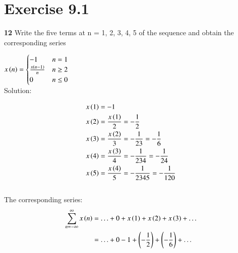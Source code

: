 \documentclass[journal,12pt,twocolumn]{IEEEtran}
\begin{document}


\vspace{3cm}

\title{}
\author{EE23BTECH11217 - Prajwal M$^{*}$
}
\maketitle
\newpage
\bigskip

\renewcommand{\thefigure}{\theenumi}
\renewcommand{\thetable}{\theenumi}


\section*{Exercise 9.1}

\noindent \textbf{12} \hspace{2pt}Write the five terms at n = 1, 2, 3, 4, 5 of the sequence and obtain the corresponding series

$ x \left(n\right) =
\begin{cases}
-1 & n = 1 \\
\frac{x \left(n-1\right)}{n} & n \geq 2 \\
 0 & n \leq 0
\end{cases}
$
\\

\noindent Solution:

\noindent
\begin{align}
x \left(1\right) & = -1 \\
x \left(2\right) & = \frac{x \left(1\right)}{2} = -\frac{1}{2} \\
x \left(3\right) & = \frac{x \left(2\right)}{3} = -\frac{1}{2   3} = -\frac{1}{6}\\
x \left(4\right) & = \frac{x \left(3\right)}{4} = -\frac{1}{2   3   4} = -\frac{1}{24}\\
x \left(5\right) & = \frac{x \left(4\right)}{5} = -\frac{1}{2   3   4   5} = -\frac{1}{120}
\end{align} \\


The corresponding series:
\begin{align}
    \sum_{n=-\infty}^{\infty} x \left(n\right) & = \ldots + 0 + x \left(1\right) + x \left(2\right) + x \left(3\right) + \ldots \\
    & = \ldots + 0 -1 +   \left(-\frac{1}{2} \right) +   \left(-\frac{1}{6} \right) + \ldots 
\end{align}
\end{document}

